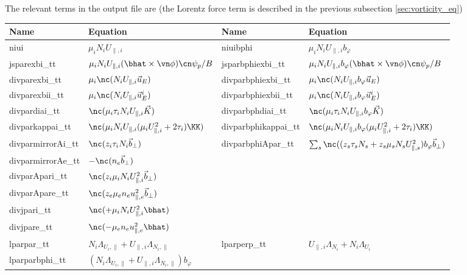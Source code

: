 The relevant terms in the output file are (the Lorentz force term is described in the previous subsection \ref{sec:vorticity_eq})
\begin{longtable}{llll}
\toprule
\rowcolor{gray!50}\textbf{Name} &  \textbf{Equation} &
\textbf{Name} &  \textbf{Equation}\\
\midrule
    niui &$\mu_i N_i U_{\parallel,i}$ &
    niuibphi &$\mu_i N_iU_{\parallel,i}b_\varphi$ \\
    jsparexbi\_tt       & $\mu_i N_iU_{\parallel,i}(\bhat\times\vn\phi)\cn \psi_p/B$ &
    jsparbphiexbi\_tt   & $\mu_i N_iU_{\parallel,i}b_\varphi(\bhat\times\vn\phi)\cn \psi_p/B$ \\
    divparexbi\_tt       & $\mu_i \nc (N_iU_{\parallel,i}\vec u_E)$ &
    divparbphiexbi\_tt   & $\mu_i\nc( N_iU_{\parallel,i}b_\varphi \vec u_E)$ \\
    divparexbii\_tt       & $\mu_i \nc (N_iU_{\parallel,i}\vec u_E^i)$ &
    divparbphiexbii\_tt   & $\mu_i\nc( N_iU_{\parallel,i}b_\varphi \vec u_E^i)$ \\
    divpardiai\_tt       & $\nc(\mu_i \tau_i N_iU_{\parallel,i}\vec K)$ &
    divparbphdiai\_tt   & $\nc ( \mu_i \tau_i N_iU_{\parallel,i}b_\varphi\vec K)$ \\
    divparkappai\_tt       & $\nc (\mu_i N_iU_{\parallel,i} ( \mu_i U_{\parallel,i}^2 + 2\tau_i)\KK )$ &
    divparbphikappai\_tt       & $\nc( \mu_i N_iU_{\parallel,i}b_\varphi ( \mu_i U_{\parallel,i}^2 + 2\tau_i)\KK)$ \\
    divparmirrorAi\_tt       & $\nc(z_i \tau_i N_i \vec b_\perp)$ &
    divparbphiApar\_tt   & $\sum_s \nc ((z_s \tau_s N_s + z_s \mu_s N_s U_{\parallel,s}^2)b_\varphi \vec b_\perp)$ \\
    divparmirrorAe\_tt       & $-\nc ( n_e \vec b_\perp)$ &
    & \\
    divparApari\_tt       & $\nc( z_i \mu_i N_i U_{\parallel,i}^2\vec b_\perp)$ &
    & \\
    divparApare\_tt       & $\nc( z_e \mu_e n_e u_{\parallel,e}^2\vec b_\perp)$ &
    & \\
    divjpari\_tt & $ \nc( +\mu_i N_i U_{\parallel,i}^2 \bhat)$ &
    & \\
    divjpare\_tt & $ \nc( -\mu_e n_e u_{\parallel,e}^2 \bhat)$ &
    & \\
    lparpar\_tt   & $N_i \Lambda_{U_i,\parallel} + U_{\parallel,i} \Lambda_{N_i,\parallel}$ &
    lparperp\_tt & $U_{\parallel,i} \Lambda_{N_i} + N_i\Lambda_{U_i} $ \\
    lparparbphi\_tt   & $(N_i \Lambda_{U_i,\parallel} + U_{\parallel,i} \Lambda_{N_i,\parallel})b_\varphi$ &

\end{longtable}
